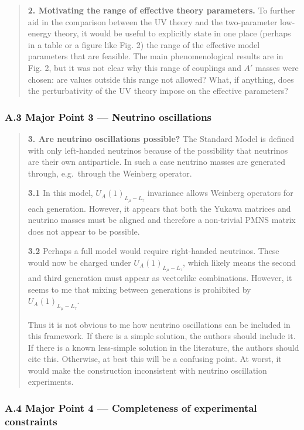 \documentclass[
  chinese,
  UTF8]{ctexart}
\begin{document}
\begin{quote}
\textbf{2. Motivating the range of effective theory parameters.} To
further aid in the comparison between the UV theory and the
two-parameter low-energy theory, it would be useful to explicitly state
in one place (perhaps in a table or a figure like Fig. 2) the range of
the effective model parameters that are feasible. The main
phenomenological results are in Fig. 2, but it was not clear why this
range of couplings and \(A'\) masses were chosen: are values outside
this range not allowed? What, if anything, does the perturbativity of
the UV theory impose on the effective parameters?
\end{quote}

\subsubsection{A.3 Major Point 3 --- Neutrino
oscillations}\label{a.3-major-point-3-neutrino-oscillations}

\begin{quote}
\textbf{3. Are neutrino oscillations possible?} The Standard Model is
defined with only left-handed neutrinos because of the possibility that
neutrinos are their own antiparticle. In such a case neutrino masses are
generated through, e.g.~through the Weinberg operator.

\textbf{3.1} In this model, \(U_A(1)_{L_\mu-L_\tau}\) invariance allows
Weinberg operators for each generation. However, it appears that both
the Yukawa matrices and neutrino masses must be aligned and therefore a
non-trivial PMNS matrix does not appear to be possible.

\textbf{3.2} Perhaps a full model would require right-handed neutrinos.
These would now be charged under \(U_A(1)_{L_\mu-L_\tau}\), which likely
means the second and third generation must appear as vectorlike
combinations. However, it seems to me that mixing between generations is
prohibited by \(U_A(1)_{L_\mu-L_\tau}\).

Thus it is not obvious to me how neutrino oscillations can be included
in this framework. If there is a simple solution, the authors should
include it. If there is a known less-simple solution in the literature,
the authors should cite this. Otherwise, at best this will be a
confusing point. At worst, it would make the construction inconsistent
with neutrino oscillation experiments.
\end{quote}

\subsubsection{A.4 Major Point 4 --- Completeness of experimental
constraints}\label{a.4-major-point-4-completeness-of-experimental-constraints}
\end{document}
